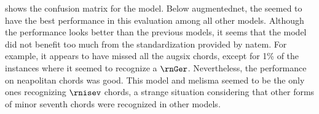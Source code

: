 
 shows the confusion
matrix for the \textcite{mcleod2021modular} model. Below
\gls{augmentednet}, the \textcite{mcleod2021modular} seemed
to have the best performance in this evaluation among all
other models. Although the performance looks better than the
previous models, it seems that the model did not benefit too
much from the standardization provided by \gls{natem}. For
example, it appears to have missed all the \gls{augsix}
chords, except for 1\% of the instances where it seemed to
recognize a $\rnGer$. Nevertheless, the performance on
\gls{neapolitan} chords was good. This model and
\gls{melisma} seemed to be the only ones recognizing
$\rnisev$ chords, a strange situation considering that other
forms of minor seventh chords were recognized in other
models.

